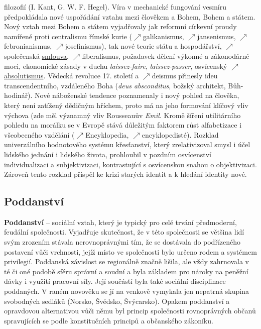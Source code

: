 \documentclass{article}
\begin{document}
filozofií (I. Kant, G. W. F. Hegel). Víra v mechanické fungování vesmíru předpokládala nové uspořádání vztahu mezi člověkem a Bohem, Bohem a státem. Nový vztah mezi Bohem a státem vyjadřovaly jak reformní církevní proudy namířené proti centralismu římské kurie ($\nearrow$galikanismus, $\nearrow$jansenismus, $\nearrow$febronianismus, $\nearrow$josefinismus), tak nové teorie státu a hospodářství, $\nearrow$společenská \hyperref[sec:spolecenskaSmlouva]{smlouva}, $\nearrow$liberalismus, požadavek dělení výkonné a zákonodárné moci, ekonomické zásady v duchu {\it laissez-faire}, {\it laissez-passer}, osvícenský $\nearrow$\hyperref[sec:absolutismus]{absolutismus}. Vědecká revoluce 17. století a $\nearrow$deismus přinesly ideu transcendentního, vzdáleného Boha ({\it deus absconditus}, božský architekt, Bůh-hodinář). Nové náboženské tendence poznamenaly i nový pohled na člověka, který není zatížený dědičným hříchem, proto má na jeho formování klíčový vliv výchova (zde měl významný vliv Rousseauův {\it Emil}. Kromě šíření utilitárního pohledu na morálku se v Evropě stává důležitým faktorem růst alfabetizace i všeobecného vzdělání ($\nearrow$Encyklopedia, $\nearrow$encyklopedisté). Rozklad univerzálního hodnotového systému křesťanství, který zrelativizoval smysl i účel lidského jednání i lidského života, prohloubil v pozdním osvícenství individualizaci a subjektivizaci, kontrastující s osvícenskou snahou o objektivizaci. Zároveň tento rozklad přispěl ke krizi starých identit a k hledání identity nové.

  \subsection*{Poddanství~\cite{Hroch:}}
  \label{sec:poddanstvi}

  {\bf Poddanství} -- sociální vztah, který je typický pro celé trvání předmoderní, feudální společnosti. Vyjadřuje skutečnost, že v této společnosti se většina lidí svým zrozením stávala nerovnoprávnými tím, že se dostávala do podřízeného postavení vůči vrchnosti, jejíž místo ve společnosti bylo určeno rodem a systémem privilegií. Poddanská závislost se regionálně značně lišila, ale vždy zahrnovala v té či oné podobě sféru správní a soudní a byla základem pro nároky na peněžní dávky i využití pracovní síly. Její součástí byla také sociální disciplinace poddaných. V raném novověku se jí na venkově vymykala jen nepatrná skupina svobodných sedláků (Norsko, Švédsko, Švýcarsko). Opakem poddanství a opravdovou alternativou vůči němu byl princip společnosti rovnoprávných občanů spravujících se podle konstitučních principů a občanského zákoníku.
\end{document}

